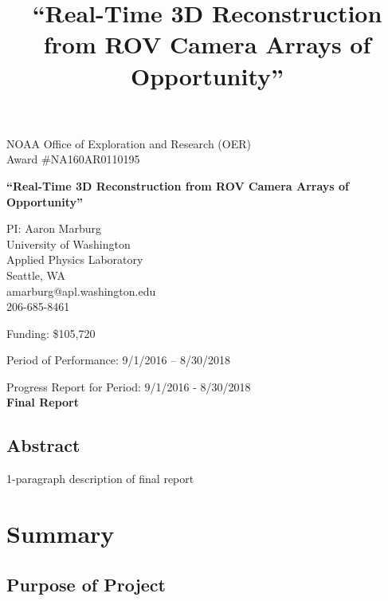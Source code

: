 \documentclass[letterpaper,12pt]{article}
\title{“Real-Time 3D Reconstruction from ROV Camera Arrays of Opportunity”}
\begin{document}
\begin{center} 

\vfill

{\large NOAA Office of Exploration and Research (OER)\\
Award \#NA160AR0110195}

\vspace{1em}

\textbf{\Large “Real-Time 3D Reconstruction from ROV Camera Arrays of Opportunity”}

\vfill

PI:   Aaron Marburg \\
University of Washington  \\
Applied Physics Laboratory \\
Seattle, WA \\
amarburg@apl.washington.edu \\
206-685-8461

\vfill

Funding:  \$105,720

Period of Performance:  9/1/2016 – 8/30/2018

Progress Report for Period:   9/1/2016 - 8/30/2018 \\
\textbf{Final Report}

\vfill 

%
\end{center} \clearpage


\subsection*{Abstract} 
1-paragraph description of final report

\section{Summary}

\subsection{Purpose of Project}
\end{document}
